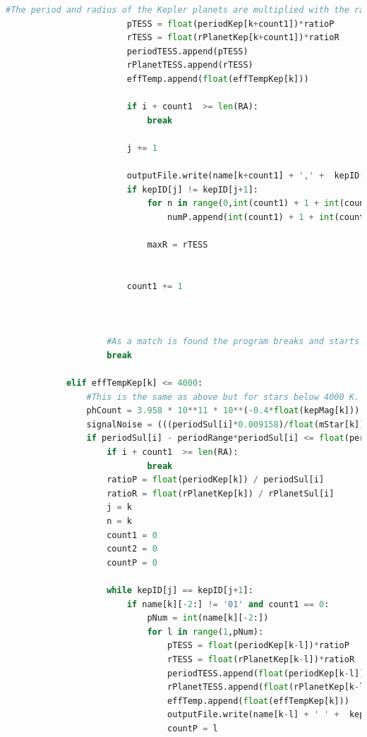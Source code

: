 \documentclass[12pt]{report}
\begin{document}
\begin{appendix}
\begin{lstlisting}[language=Python]
						#The period and radius of the Kepler planets are multiplied with the ratio of period and radius to create the artificial systems.
						pTESS = float(periodKep[k+count1])*ratioP
						rTESS = float(rPlanetKep[k+count1])*ratioR
						periodTESS.append(pTESS)
						rPlanetTESS.append(rTESS)
						effTemp.append(float(effTempKep[k]))
							
						if i + count1  >= len(RA):
							break
							
						j += 1		
						
						outputFile.write(name[k+count1] + ',' +  kepID[k+count1] + ',' + str(pTESS) + ',' + str(rTESS) + ',' + mStar[k+count1] + ',' + numEpoch[k+count1] + ','  + transitDur[k+count1] + ',' + rStar[k+count1] + ',' + str(RA[i]) + ',' + str(dec[i]) + ',' + effTempKep[k] + ',' + str(effTempSul[i]) + ',' + str(ICMag[i]) + '\n')
						if kepID[j] != kepID[j+1]:
							for n in range(0,int(count1) + 1 + int(countP)):
								numP.append(int(count1) + 1 + int(countP))

							maxR = rTESS
							
							
						count1 += 1
						
						
							
					#As a match is found the program breaks and starts with the next planet in the Sullivan list.
					break
				
			elif effTempKep[k] <= 4000:
				#This is the same as above but for stars below 4000 K.
				phCount = 3.958 * 10**11 * 10**(-0.4*float(kepMag[k]))
				signalNoise = (((periodSul[i]*0.009158)/float(mStar[k]))**2)/((1/math.sqrt(phCount)) * (1/math.sqrt(6)))
				if periodSul[i] - periodRange*periodSul[i] <= float(periodKep[k]) <= periodSul[i] + periodRange*periodSul[i] and rPlanetSul[i] - radiusRange*rPlanetSul[i] <= float(rPlanetKep[k]) <= rPlanetSul[i] + radiusRange*rPlanetSul[i] and effTempSul[i] < 4000 and signalNoise > SNRTH:
					if i + count1  >= len(RA):
							break
					ratioP = float(periodKep[k]) / periodSul[i]	
					ratioR = float(rPlanetKep[k]) / rPlanetSul[i]
					j = k
					n = k
					count1 = 0
					count2 = 0
					countP = 0
					
					while kepID[j] == kepID[j+1]:
						if name[k][-2:] != '01' and count1 == 0:
							pNum = int(name[k][-2:])
							for l in range(1,pNum):
								pTESS = float(periodKep[k-l])*ratioP
								rTESS = float(rPlanetKep[k-l])*ratioR	
								periodTESS.append(float(periodKep[k-l])/ratioP)
								rPlanetTESS.append(float(rPlanetKep[k-l])/ratioR)
								effTemp.append(float(effTempKep[k]))
								outputFile.write(name[k-l] + ' ' +  kepID[k-l] + ' ' + str(pTESS) + ' ' + str(rTESS) + ' ' + mStar[k-l] + ' ' + numEpoch[k-l] + ' '  + transitDur[k-l] + ' ' + rStar[k-l] + ' ' + str(RA[i+count1]) + ' ' + str(dec[i+count1]) + ' ' + effTempKep[k+count1] + ' ' + str(effTempSul[i+count1]) + ' ' + str(ICMag[i+count1]) + '\n')
								countP = l
								

\end{lstlisting}
\end{appendix}
\end{document}

